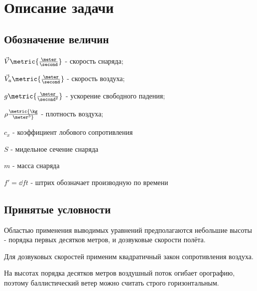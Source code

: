 \section{Описание задачи}
\subsection{Обозначение величин}
\paragraph{}
$ \vec{V} \metric{\frac{\meter}{\second}} $ - скорость снаряда;

$ \vec{V}_a \metric{\frac{\meter}{\second}} $ - скорость воздуха;

$g \metric{\frac{\meter}{\second^2}}$ - ускорение свободного падения;

$\rho \metric{\kg \over \meter^3}$ - плотность воздуха;

$c_x$ - коэффициент лобового сопротивления

$S$ - мидельное сечение снаряда

$m$ - масса снаряда

$f'=\dd{f}{t}$ - штрих обозначает производную по времени

\subsection{Принятые условности}
Областью применения выводимых уравнений предполагаются небольшие высоты - порядка первых десятков метров, и дозвуковые скорости полёта.

Для дозвуковых скоростей применим квадратичный закон сопротивления воздуха.

На высотах порядка десятков метров воздушный поток огибает орографию, поэтому баллистический ветер можно считать строго горизонтальным.




